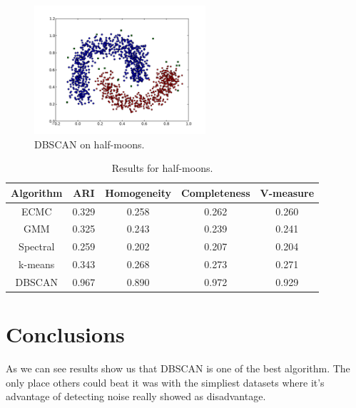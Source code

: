 \documentclass[conference]{IEEEtran}
\begin{document}
\begin{figure}[th]
\centering
\includegraphics[width=15pc]{dbscan_half-moons.pdf}
\caption{DBSCAN on half-moons.}
\label{DBSCAN_halfmoons}
\end{figure}

\begin{table}[htbp]
\caption{Results for half-moons.}
\label{halfmoonsresults}
\begin{center}
\setlength{\tabcolsep}{3pt}
\begin{tabular}{ |c|c|c|c|c| }
\hline
	\bf Algorithm & \bf ARI & \bf Homogeneity & \bf Completeness & \bf V-measure\\ \hline
	
	ECMC & 0.329 & 0.258 & 0.262 & 0.260 \\ \hline
	GMM & 0.325 & 0.243 & 0.239 & 0.241 \\ \hline
	Spectral & 0.259 & 0.202 & 0.207 & 0.204 \\ \hline
	k-means & 0.343 & 0.268 & 0.273 & 0.271 \\ \hline
	DBSCAN & 0.967 & 0.890 & 0.972 & 0.929 \\ \hline
\end{tabular}
\end{center}
\end{table}


\section{Conclusions}

As we can see results show us that DBSCAN is one of the best algorithm. The only place others
could beat it was with the simpliest datasets where it's advantage of detecting noise really showed
as disadvantage.
\end{document}
